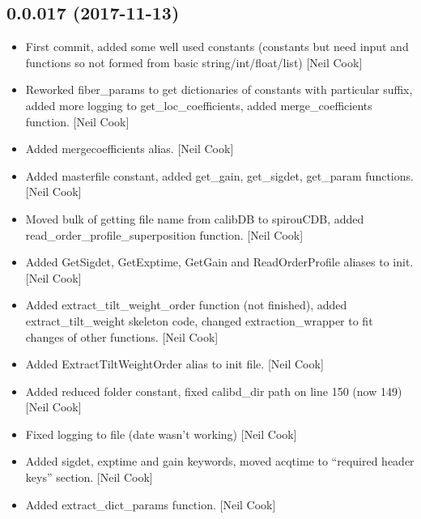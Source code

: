 \documentclass[a4paper,10pt,english]{report}
\begin{document}
\subsection{0.0.017 (2017-11-13)}
\label{\detokenize{misc/changelog:id532}}\begin{itemize}
\item {} 
First commit, added some well used constants (constants but need input
and functions so not formed from basic string/int/float/list) {[}Neil
Cook{]}

\item {} 
Reworked fiber\_params to get dictionaries of constants with particular
suffix, added more logging to get\_loc\_coefficients, added
merge\_coefficients function. {[}Neil Cook{]}

\item {} 
Added mergecoefficients alias. {[}Neil Cook{]}

\item {} 
Added masterfile constant, added get\_gain, get\_sigdet, get\_param
functions. {[}Neil Cook{]}

\item {} 
Moved bulk of getting file name from calibDB to spirouCDB, added
read\_order\_profile\_superposition function. {[}Neil Cook{]}

\item {} 
Added GetSigdet, GetExptime, GetGain and ReadOrderProfile aliases to
init. {[}Neil Cook{]}

\item {} 
Added extract\_tilt\_weight\_order function (not finished), added
extract\_tilt\_weight skeleton code, changed extraction\_wrapper to fit
changes of other functions. {[}Neil Cook{]}

\item {} 
Added ExtractTiltWeightOrder alias to init file. {[}Neil Cook{]}

\item {} 
Added reduced folder constant, fixed calibd\_dir path on line 150 (now
149) {[}Neil Cook{]}

\item {} 
Fixed logging to file (date wasn’t working) {[}Neil Cook{]}

\item {} 
Added sigdet, exptime and gain keywords, moved acqtime to “required
header keys” section. {[}Neil Cook{]}

\item {} 
Added extract\_dict\_params function. {[}Neil Cook{]}


\end{itemize}
\end{document}
